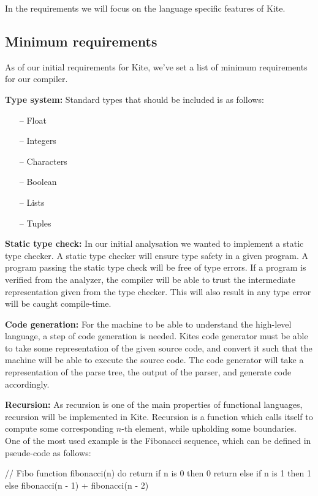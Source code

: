 In the requirements we will focus on the language specific features of
Kite. 

\subsection{Minimum requirements}
As of our initial requirements for Kite, we've set a list of minimum
requirements for our compiler.

\textbf{Type system:} Standard types that should be included is as
follows:
\begin{itemize}
\item [--] Float
\item [--] Integers
\item [--] Characters
\item [--] Boolean
\item [--] Lists
\item [--] Tuples
\end{itemize}

\textbf{Static type check:} In our initial analysation we wanted to
implement a static type checker. A static type checker will ensure
type safety in a given program. A program passing the static type
check will be free of type errors. If a program is verified from the
analyzer, the compiler will be able to trust the intermediate
representation given from the type checker. This will also result in
any type error will be caught compile-time.

\textbf{Code generation:} For the machine to be able to understand the
high-level language, a step of code generation is needed. Kites code
generator must be able to take some representation of the given source
code, and convert it such that the machine will be able to execute the
source code. The code generator will take a representation of the
parse tree, the output of the parser, and generate code
accordingly.

\textbf{Recursion:} As recursion is one of the main properties of
functional languages, recursion will be implemented in Kite. Recursion
is a function which calls itself to compute some corresponding $n$-th
element, while upholding some boundaries. One of the most used example
is the Fibonacci sequence, which can be defined in pseude-code as
follows:
\begin{pseudo}
// Fibo
function fibonacci(n) do
  return if n is 0
    then 0
  return else if n is 1
    then 1
  else fibonacci(n - 1) + fibonacci(n - 2)
\end{pseudo}

